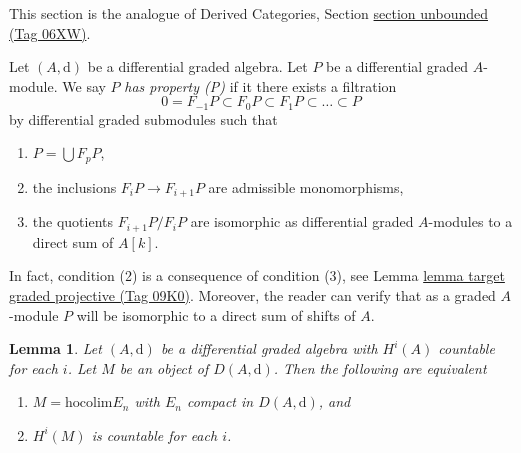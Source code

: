 \documentclass{amsart}
\theoremstyle{plain}
\newtheorem{lemma}[subsection]{Lemma}
\theoremstyle{definition}
\theoremstyle{remark}
\numberwithin{equation}{subsection}
\begin{document}
\noindent
This section is the analogue of
Derived Categories, Section \href{https://stacks.math.columbia.edu/tag/06XW}{section unbounded (Tag 06XW)}.

\medskip\noindent
Let $(A, \text{d})$ be a differential graded algebra.
Let $P$ be a differential graded $A$-module. We say $P$
{\it has property (P)} if it there exists a filtration
$$
0 = F_{-1}P \subset F_0P \subset F_1P \subset \ldots \subset P
$$
by differential graded submodules such that
\begin{enumerate}
\item $P = \bigcup F_pP$,
\item the inclusions $F_iP \to F_{i + 1}P$ are admissible
monomorphisms,
\item the quotients $F_{i + 1}P/F_iP$ are isomorphic as differential
graded $A$-modules to a direct sum of $A[k]$.
\end{enumerate}
In fact, condition (2) is a consequence of condition (3), see
Lemma \href{https://stacks.math.columbia.edu/tag/09K0}{lemma target graded projective (Tag 09K0)}. Moreover, the reader
can verify that as a graded $A$-module $P$ will be isomorphic to a
direct sum of shifts of $A$.


\begin{lemma}
\label{lemma-countable}
Let $(A, \text{d})$ be a differential graded algebra with
$H^i(A)$ countable for each $i$. Let $M$ be an object of $D(A, \text{d})$.
Then the following are equivalent
\begin{enumerate}
\item $M = \text{hocolim} E_n$ with $E_n$ compact in $D(A, \text{d})$, and
\item $H^i(M)$ is countable for each $i$.
\end{enumerate}
\end{lemma}
\end{document}
